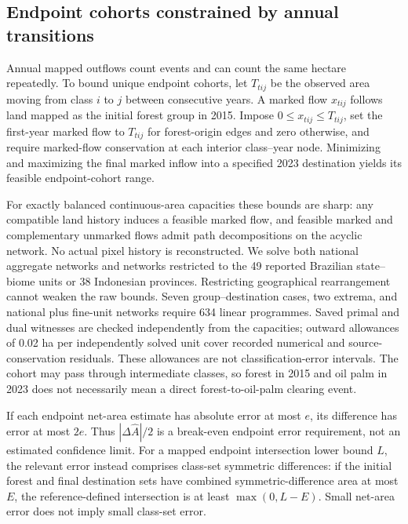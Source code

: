 \subsection{Endpoint cohorts constrained by annual transitions}\label{sec:flowmethods}
Annual mapped outflows count events and can count the same hectare repeatedly. To bound unique endpoint cohorts, let $T_{tij}$ be the observed area moving from class $i$ to $j$ between consecutive years. A marked flow $x_{tij}$ follows land mapped as the initial forest group in 2015. Impose $0\le x_{tij}\le T_{tij}$, set the first-year marked flow to $T_{tij}$ for forest-origin edges and zero otherwise, and require marked-flow conservation at each interior class--year node. Minimizing and maximizing the final marked inflow into a specified 2023 destination yields its feasible endpoint-cohort range.

For exactly balanced continuous-area capacities these bounds are sharp: any compatible land history induces a feasible marked flow, and feasible marked and complementary unmarked flows admit path decompositions on the acyclic network. No actual pixel history is reconstructed. We solve both national aggregate networks and networks restricted to the 49 reported Brazilian state--biome units or 38 Indonesian provinces. Restricting geographical rearrangement cannot weaken the raw bounds. Seven group--destination cases, two extrema, and national plus fine-unit networks require 634 linear programmes. Saved primal and dual witnesses are checked independently from the capacities; outward allowances of 0.02 ha per independently solved unit cover recorded numerical and source-conservation residuals. These allowances are not classification-error intervals. The cohort may pass through intermediate classes, so forest in 2015 and oil palm in 2023 does not necessarily mean a direct forest-to-oil-palm clearing event.

If each endpoint net-area estimate has absolute error at most $e$, its difference has error at most $2e$. Thus $|\Delta\widehat A|/2$ is a break-even endpoint error requirement, not an estimated confidence limit. For a mapped endpoint intersection lower bound $L$, the relevant error instead comprises class-set symmetric differences: if the initial forest and final destination sets have combined symmetric-difference area at most $E$, the reference-defined intersection is at least $\max(0,L-E)$. Small net-area error does not imply small class-set error.

